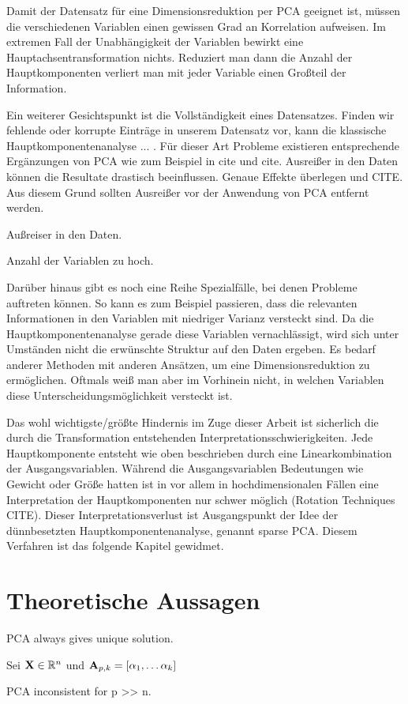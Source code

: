 Damit der Datensatz für eine Dimensionsreduktion per PCA geeignet ist, müssen die verschiedenen Variablen einen gewissen Grad an Korrelation aufweisen. Im extremen Fall der Unabhängigkeit der Variablen bewirkt eine Hauptachsentransformation nichts. Reduziert man dann die Anzahl der Hauptkomponenten verliert man mit jeder Variable einen Großteil der Information.

Ein weiterer Gesichtspunkt ist die Vollständigkeit eines Datensatzes. Finden wir fehlende oder korrupte Einträge in unserem Datensatz vor, kann die klassische Hauptkomponentenanalyse ... . Für dieser Art Probleme existieren entsprechende Ergänzungen von PCA wie zum Beispiel in cite und cite. Ausreißer in den Daten können die Resultate drastisch beeinflussen. Genaue Effekte überlegen und CITE. Aus diesem Grund sollten Ausreißer vor der Anwendung von PCA entfernt werden.

Außreiser in den Daten.

Anzahl der Variablen zu hoch.

Darüber hinaus gibt es noch eine Reihe Spezialfälle, bei denen Probleme auftreten können. So kann es zum Beispiel passieren, dass die relevanten Informationen in den Variablen mit niedriger Varianz versteckt sind. Da die Hauptkomponentenanalyse gerade diese Variablen vernachlässigt, wird sich unter Umständen nicht die erwünschte Struktur auf den Daten ergeben. Es bedarf anderer Methoden mit anderen Ansätzen, um eine Dimensionsreduktion zu ermöglichen. Oftmals weiß man aber im Vorhinein nicht, in welchen Variablen diese Unterscheidungsmöglichkeit versteckt ist.

Das wohl wichtigste/größte Hindernis im Zuge dieser Arbeit ist sicherlich die durch die Transformation entstehenden Interpretationsschwierigkeiten. Jede Hauptkomponente entsteht wie oben beschrieben durch eine Linearkombination der Ausgangsvariablen. Während die Ausgangsvariablen Bedeutungen wie Gewicht oder Größe hatten ist in vor allem in hochdimensionalen Fällen eine Interpretation der Hauptkomponenten nur schwer möglich (Rotation Techniques CITE). Dieser Interpretationsverlust ist Ausgangspunkt der Idee der dünnbesetzten Hauptkomponentenanalyse, genannt sparse PCA. Diesem Verfahren ist das folgende Kapitel gewidmet.


\section{Theoretische Aussagen}

\begin{thm}
PCA always gives unique solution.
\end{thm}

\begin{thm}
Sei $\mathbf{X} \in \mathbb{R}^n$ und $\mathbf{A}_{p,k} = [\alpha_1, \ldots \alpha_k] $   
\end{thm}

\begin{thm}
PCA inconsistent for p >> n.
\end{thm}

